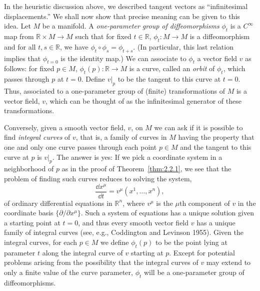 In the heuristic discussion above, we described tangent vectors as ``infinitesimal
displacements.''  We shall now show that precise meaning can be given to this idea.
Let \(M\) be a manifold.  A \emph{one-parameter group of diffeomorphisms}
\(\phi_t\) is a \(C^\infty\) map from \(\mathbb{R}\times M\to M\) such that for
fixed \(t\in\mathbb{R}\), \(\phi_t:M\to M\) is a diffeomorphism and for all
\(t,s\in\mathbb{R}\), we have \(\phi_t\circ\phi_s=\phi_{t+s}\).  (In particular,
this last relation implies that \(\phi_{t=0}\) is the identity map.)  We can
associate to \(\phi_t\) a vector field \(v\) as follows: for fixed \(p\in M\),
\(\phi_t(p):\mathbb{R}\to M\) is a curve, called an \emph{orbit} of \(\phi_t\),
which passes through \(p\) at \(t=0\).  Define \(v|_p\) to be the tangent to this
curve at \(t=0\).  Thus, associated to a one-parameter group of (finite)
transformations of \(M\) is a vector field, \(v\), which can be thought of as the
infinitesimal generator of these transformations.

Conversely, given a smooth vector field, \(v\), on \(M\) we can ask if it is
possible to find \emph{integral curves} of \(v\), that is, a family of curves in
\(M\) having the property that one and only one curve passes through each point
\(p\in M\) and the tangent to this curve at \(p\) is \(v|_p\).  The answer is yes:
If we pick a coordinate system in a neighborhood of \(p\) as in the proof of
Theorem~\ref{thm:2.2.1}, we see that the problem of finding such curves reduces to
solving the system,
\begin{equation}
  \frac{\dd x^\mu}{\dd t}=v^\mu(x^1,\ldots,x^n),
  \tag{2.2.13}\label{eq:2.2.13}
\end{equation}
of ordinary differential equations in \(\mathbb{R}^n\), where \(v^\mu\) is the
\(\mu\)th component of \(v\) in the coordinate basis
\(\{\partial/\partial x^\mu\}\).  Such a system of equations has a unique
solution given a starting point at \(t=0\), and thus every smooth vector field \(v\)
has a unique family of integral curves (see, e.g., Coddington and Levinson 1955).
Given the integral curves, for each \(p\in M\) we define \(\phi_t(p)\) to be the
point lying at parameter \(t\) along the integral curve of \(v\) starting at \(p\).
Except for potential problems arising from the possibility that the integral curves of
\(v\) may extend to only a finite value of the curve parameter, \(\phi_t\) will be a
one-parameter group of diffeomorphisms.

